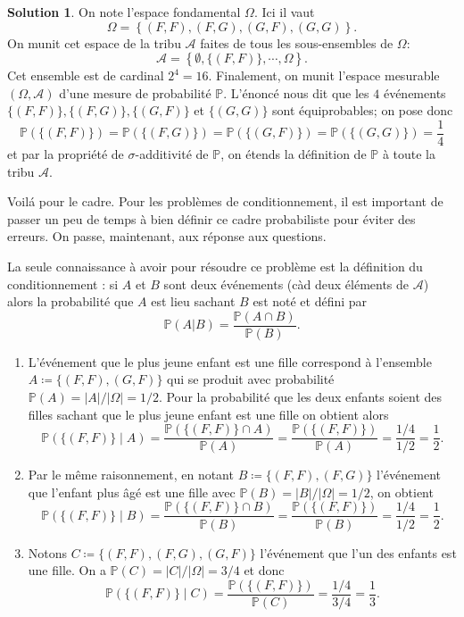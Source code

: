 \documentclass[11pt]{article}
\renewcommand{\P}{{\mathbb P}}
\theoremstyle{definition}
\newtheorem*{solution}{Solution}
\begin{document}
\medskip

\begin{solution}
On note l'espace fondamental $\Omega$. Ici il vaut
\begin{equation*}
\Omega = \left\{(F,F), (F,G), (G,F), (G,G)\right\}.
\end{equation*}On munit cet espace de la tribu $\mathcal A$ faites de tous les sous-ensembles de $\Omega$:
\begin{equation*}
\mathcal A=\left\{\emptyset, \{(F,F)\}, \cdots, \Omega\right\}.
\end{equation*}Cet ensemble est de cardinal $2^4=16$. Finalement, on munit l'espace mesurable $(\Omega, \mathcal A)$ d'une mesure de probabilit{\'e} $\mathbb{P}$. L'énoncé nous dit que les $4$ événements $\{(F,F)\}, \{(F,G)\}, \{(G,F)\}$ et $\{(G,G)\}$ sont équiprobables; on pose donc
\begin{equation*}
\mathbb{P}(\{(F,F)\})=\mathbb{P}( \{(F,G)\})=\mathbb{P}(\{(G,F)\})=\mathbb{P}(\{(G,G)\})=\frac{1}{4}
\end{equation*}et par la propri{\'e}t{\'e} de $\sigma$-additivit{\'e} de $\mathbb P$, on étends la définition de $\mathbb P$ à toute la tribu $\mathcal A$.
\end{solution}

Voil{\'a} pour le cadre. Pour les probl{\`e}mes de conditionnement, il est important de passer un peu de temps {\`a} bien d{\'e}finir ce cadre probabiliste pour {\'e}viter des erreurs. On passe, maintenant, aux réponse aux questions. 

La seule connaissance {\`a} avoir pour r{\'e}soudre ce probl{\`e}me est la d{\'e}finition du conditionnement : si $A$ et $B$ sont deux {\'e}v{\'e}nements (c{\`a}d deux {\'e}l{\'e}ments de $\mathcal A$) alors la probabilité que $A$ est lieu sachant $B$ est not{\'e} et d{\'e}fini par
\begin{equation*}
\P(A|B)=\frac{\P(A\cap B)}{\P(B)}.
\end{equation*}

\begin{enumerate}
\item
 L'\'ev\'enement que le plus jeune enfant est une fille correspond à l'ensemble $A\coloneqq\{(F,F),(G,F)\}$ qui se produit avec probabilit\'e $\P(A)=|A| / |\Omega|=1/2$. Pour la probabilit\'e que les deux
enfants soient des filles sachant que le plus jeune enfant est une fille on obtient alors
\[\P(\{(F,F)\} \mid A)=\frac{\P(\{(F,F)\} \cap A)}{\P(A)}=\frac{\P(\{(F,F)\} )}{\P(A)}=\frac{1/4}{1/2}=\frac12.\]
\item Par le même raisonnement, en notant  $B\coloneqq\{(F,F),(F,G)\}$ l'\'ev\'enement que l'enfant plus âg\'e est une fille avec  $\P(B)=|B| / |\Omega|=1/2$, on obtient 
\[\P(\{(F,F)\} \mid B)=\frac{\P(\{(F,F)\} \cap B)}{\P(B)}=\frac{\P(\{(F,F)\} )}{\P(B)}=\frac{1/4}{1/2}=\frac12.\]
\item Notons  $C\coloneqq\{(F,F),(F,G),(G,F)\}$ l'\'ev\'enement que l'un des enfants  est une fille. On a  $\P(C)=|C| / |\Omega|=3/4$ et donc
\[\P(\{(F,F)\} \mid C)= \frac{\P(\{(F,F)\} )}{\P(C)}=\frac{1/4}{3/4}=\frac13.\]
\end{enumerate}
\end{document}
